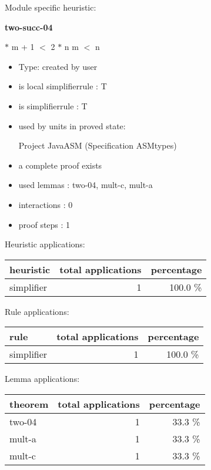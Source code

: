 \documentclass[a4paper]{article}
\begin{document}
Module specific heuristic:

\pagebreak

{\LARGE\bf two-succ-04}\label{lemma-two-succ-04}

\medskip

  $*$ m + 1 $<$ 2 $*$ n \Equiv m $<$ n

\begin{itemize}

\item Type: created by user

\item is local simplifierrule : T
\item is simplifierrule : T
\item used by units in proved state:

Project JavaASM (Specification ASMtypes)
\item       a complete proof exists
\item       used lemmas  : two-04, mult-c, mult-a
\item       interactions : 0
\item       proof steps  : 1
\end{itemize}

\medskip


Heuristic applications:

\begin{supertabular}{l|r|r}
heuristic	& total applications & percentage \\ \hline
simplifier & 1 & 100.0 \% \\

\end{supertabular}

Rule applications:

\begin{supertabular}{l|r|r}
rule	        & total applications & percentage \\ \hline
simplifier & 1 & 100.0 \% \\

\end{supertabular}

Lemma applications:

\begin{supertabular}{l|r|r}
theorem	        & total applications & percentage \\ \hline
two-04 & 1 & 33.3 \% \\
mult-a & 1 & 33.3 \% \\
mult-c & 1 & 33.3 \% \\

\end{supertabular}
\end{document}
